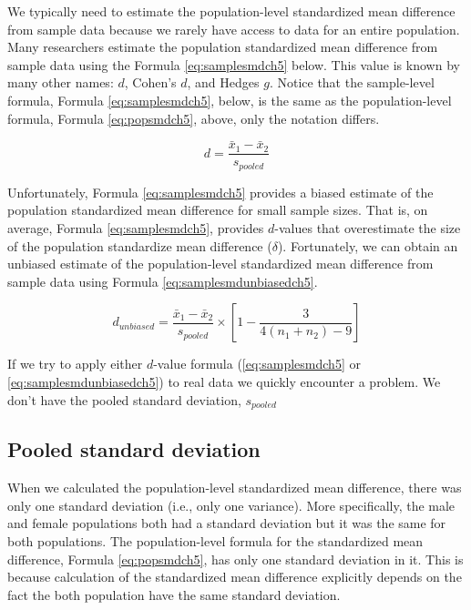 \documentclass[
]{krantz}
\begin{document}
We typically need to estimate the population-level standardized mean difference from sample data because we rarely have access to data for an entire population. Many researchers estimate the population standardized mean difference from sample data using the Formula \eqref{eq:samplesmdch5} below. This value is known by many other names: \(d\), Cohen's \(d\), and Hedges \(g\). Notice that the sample-level formula, Formula \eqref{eq:samplesmdch5}, below, is the same as the population-level formula, Formula \eqref{eq:popsmdch5}, above, only the notation differs.

\begin{equation} 
d  = \frac{\bar{x}_{1} - \bar{x}_{2}}{s_{pooled}} 
      \label{eq:samplesmdch5}
\end{equation}

Unfortunately, Formula \eqref{eq:samplesmdch5} provides a biased estimate of the population standardized mean difference for small sample sizes. That is, on average, Formula \eqref{eq:samplesmdch5}, provides \(d\)-values that overestimate the size of the population standardize mean difference (\(\delta\)). Fortunately, we can obtain an unbiased estimate of the population-level standardized mean difference from sample data using Formula \eqref{eq:samplesmdunbiasedch5}.

\begin{equation} 
d_{unbiased}  = \frac{\bar{x}_{1} - \bar{x}_{2}}{s_{pooled}} \times [1 - \frac{3}{4(n_1 + n_2)-9}]
      \label{eq:samplesmdunbiasedch5}
\end{equation}

If we try to apply either \(d\)-value formula (\eqref{eq:samplesmdch5} or \eqref{eq:samplesmdunbiasedch5}) to real data we quickly encounter a problem. We don't have the pooled standard deviation, \(s_{pooled}\)

\hypertarget{pooled-standard-deviation}{%
\subsection{Pooled standard deviation}\label{pooled-standard-deviation}}

When we calculated the population-level standardized mean difference, there was only one standard deviation (i.e., only one variance). More specifically, the male and female populations both had a standard deviation but it was the same for both populations. The population-level formula for the standardized mean difference, Formula \eqref{eq:popsmdch5}, has only one standard deviation in it. This is because calculation of the standardized mean difference explicitly depends on the fact the both population have the same standard deviation.
\end{document}
